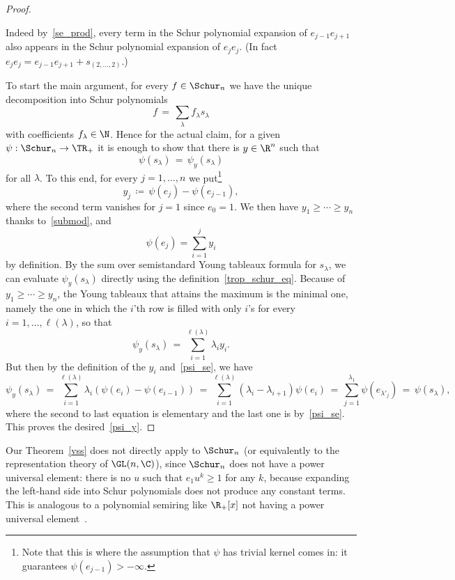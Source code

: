 \begin{proof}
\begin{itemize}
			Indeed by~\eqref{se_prod}, every term in the Schur polynomial expansion of $e_{j-1} e_{j+1}$ also appears in the Schur polynomial expansion of $e_j e_j$. (In fact $e_j e_j = e_{j-1} e_{j+1} + s_{\scriptstyle{(2,\ldots,2)}}$.)
	\end{itemize}
	To start the main argument, for every $f \in \Schur_n$ we have the unique decomposition into Schur polynomials
	\[
		f \,=\, \sum_\lambda f_\lambda s_\lambda
	\]
	with coefficients $f_\lambda \in \N$. Hence for the actual claim, for a given $\psi : \Schur_n \to \TR_+$ it is enough to show that there is $y \in \R^n$ such that
	\begin{equation}
		\label{psi_y}
		\psi(s_\lambda) \,=\, \psi_y(s_\lambda)
	\end{equation}
	for all $\lambda$. To this end, for every $j = 1,\ldots,n$ we put\footnote{Note that this is where the assumption that $\psi$ has trivial kernel comes in: it guarantees $\psi(e_{j-1}) > -\infty$.}
	\[
		y_j \,\coloneqq\, \psi(e_j) - \psi(e_{j-1}),
	\]
	where the second term vanishes for $j = 1$ since $e_0 = 1$.
	We then have $y_1 \ge \cdots \ge y_n$ thanks to~\eqref{submod}, and
	\begin{equation}
		\label{psiey}
		\psi(e_j) = \sum_{i=1}^j y_i
	\end{equation}
	by definition.
	By the sum over semistandard Young tableaux formula for $s_\lambda$, we can evaluate $\psi_y(s_\lambda)$ directly using the definition~\eqref{trop_schur_eq}.
	Because of $y_1 \ge \cdots \ge y_n$, the Young tableaux that attains the maximum is the minimal one, namely the one in which the $i$'th row is filled with only $i$'s for every $i = 1,\ldots,\ell(\lambda)$, so that
	\[
		\psi_y(s_\lambda) \,=\, \sum_{i=1}^{\ell(\lambda)} \lambda_i y_i.
	\]
	But then by the definition of the $y_i$ and~\eqref{psi_se}, we have
	\[
		\psi_y(s_\lambda) \,=\, \sum_{i=1}^{\ell(\lambda)} \lambda_i (\psi(e_i) - \psi(e_{i-1})) \,=\, \sum_{i=1}^{\ell(\lambda)} (\lambda_i - \lambda_{i+1}) \psi(e_i) \,=\, \sum_{j=1}^{\lambda_1} \psi(e_{\lambda'_j}) \,=\, \psi(s_\lambda),
	\]
	where the second to last equation is elementary and the last one is by~\eqref{psi_se}.
	This proves the desired~\eqref{psi_y}.
\end{proof}

\begin{rema}
	Our Theorem~\ref{vss} does not directly apply to $\Schur_n$ (or equivalently to the representation theory of $\GL(n,\C)$), since $\Schur_n$ does not have a power universal element: there is no $u$ such that $e_1 u^k \ge 1$ for any $k$, because expanding the left-hand side into Schur polynomials does not produce any constant terms.
	This is analogous to a polynomial semiring like $\R_+[x]$ not having a power universal element~\cite[Example~3.37]{vergleichsstellensatz}.
\end{rema}
